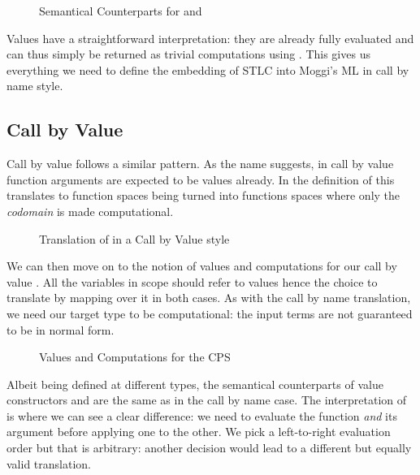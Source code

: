 \begin{figure}[h]
\caption{Semantical Counterparts for  and \label{fig:cbnelim}}
\end{figure}

Values have a straightforward interpretation: they are already fully evaluated
and can thus simply be returned as trivial computations using . This
gives us everything we need to define the embedding of STLC into Moggi's ML in
call by name style.

\subsection{Call by Value}

Call by value follows a similar pattern. As the name suggests, in call by value
function arguments are expected to be values already. In the definition of 
this translates to function spaces being turned into functions spaces where only
the \emph{codomain} is made computational.

\begin{figure}[h]
\caption{Translation of  in a Call by Value style\label{fig:moggicbv}}
\end{figure}

We can then move on to the notion of values and computations for our call by value
. All the variables in scope should refer to values hence the choice
to translate  by mapping  over it in both cases. As with the call by
name translation, we need our target type to be computational: the input terms are
not guaranteed to be in normal form.

\begin{figure}[h]
\caption{Values and Computations for the  CPS \label{fig:moggicbvalue}}
\end{figure}

Albeit being defined at different types, the semantical counterparts of value
constructors and  are the same as in the call by name case. The
interpretation of  is where we can see a clear difference: we need
to evaluate the function \emph{and} its argument before applying one to the
other. We pick a left-to-right evaluation order but that is arbitrary: another
decision would lead to a different but equally valid translation.

